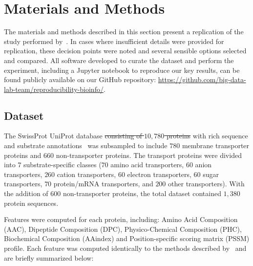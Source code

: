 \section{Materials and Methods}
\label{sec:materials}
The materials and methods described in this section present a replication of the study performed
by~\cite{mishra2014prediction}. In cases where insufficient details were provided for replication,
these decision points were noted and several sensible options selected and compared. All software 
developed to curate the dataset and perform the experiment, including a Jupyter notebook to reproduce our key results, can be found publicly available on
our GitHub repository: \url{https://github.com/big-data-lab-team/reproducibility-bioinfo/}.

\subsection{Dataset}
\label{sec:dataset}

The SwissProt UniProt database \sout{consisting of $10,780$ proteins} with rich sequence and substrate
annotations~\cite{boeckmann2003swiss} was subsampled to include $780$ membrane transporter proteins and $660$
non-transporter proteins. The transport proteins were divided into $7$ substrate-specific classes ($70$ amino acid
transporters, $60$ anion transporters, $260$ cation transporters, $60$ electron transporters, $60$ sugar
transporters, $70$ protein/mRNA transporters, and $200$ other transporters). With the addition of 600 non-transporter
proteins, the total dataset contained $1,380$ protein sequences. 

Features were computed for each protein, including: Amino Acid Composition (AAC), Dipeptide Composition (DPC),
Physico-Chemical Composition (PHC), Biochemical Composition (AAindex) and Position-specific scoring matrix (PSSM)
profile. Each feature was computed identically to the methods described by~\cite{mishra2014prediction} and are briefly
summarized below:

